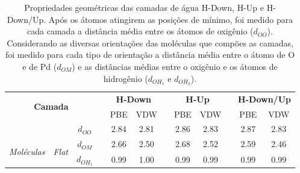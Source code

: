 \begin{table}[t!]
	\centering
	\caption{Propriedades geométricas das camadas de água H-Down, H-Up e H-Down/Up. Após os átomos atingirem as posições de mínimo, foi medido para cada camada a distância média entre os átomos de oxigênio ($ {d_{OO}} $). Considerando as diversas orientações das moléculas que compões as camadas, foi medido para cada tipo de orientação a distância média entre o átomo de O e de Pd ($ {d_{OM}} $) e as distâncias médias entre o oxigênio e os átomos de hidrogênio ($ {d_{OH_1}}$ e $ {d_{OH_2}}$).\label{tab:camada}}
	\begin{tabular}{cccccccccccc} 
		\hline\hline\addlinespace[3.5pt]
		\multicolumn{12}{c}{\textbf{Propriedades Geométricas ($ \si{\angstrom} $) - Camada de Água}}                                                                                                                                                                                                              \\ 
		\midrule
		\multicolumn{3}{c}{\multirow{2}{*}{\textbf{Camada}}}                                                                                                  &  & \multicolumn{2}{c}{\textbf{H-Down}} &  & \multicolumn{2}{c}{\textbf{H-Up}} &  & \multicolumn{2}{c}{\textbf{H-Down/Up}}  \\ 
		\cmidrule{5-6}\cmidrule{8-9}\cmidrule{11-12}
		\multicolumn{3}{c}{}                                                                                                                                  &  & PBE  & VDW                      &  & PBE  & VDW                     &  & PBE  & VDW                             \\ 
		\midrule
		&                                                                                       & ${d_{OO}}$   &  & 2.84 & 2.81                         &  & 2.86 & 2.83                       &  & 2.87 & 2.83                               \\ 
		\midrule
		\multirow{9}{*}{\textit{Moléculas}} & \multirow{3}{*}{\textit{Flat}}                                                        & ${d_{OM}} $ &  & 2.66 & 2.50                         &  & 2.68 & 2.52                       &  & 2.59 & 2.46                               \\
		&                                                                                       & ${d_{OH_1}}$ &  & 0.99 & 1.00                         &  & 0.99 & 0.99                       &  & 0.99 & 0.99                               \\

\end{tabular}
\end{table}
